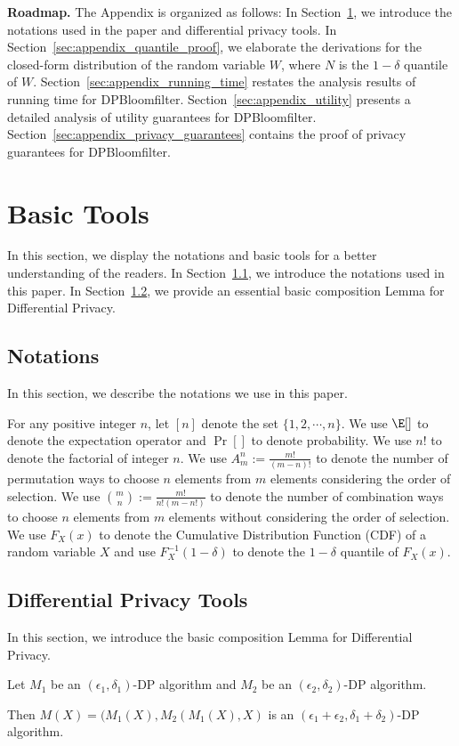 
{\bf Roadmap.} The Appendix is organized as follows:
In Section~\ref{sec:appendix_basic_tools}, we introduce the notations used in the paper and differential privacy tools.
In Section~\ref{sec:appendix_quantile_proof}, we elaborate the derivations for the closed-form distribution of the random variable $W$, where $N$ is the $1 - \delta$ quantile of $W$. 
Section~\ref{sec:appendix_running_time} restates the analysis results of running time for DPBloomfilter.
Section~\ref{sec:appendix_utility} presents a detailed analysis of utility guarantees for DPBloomfilter.
Section~\ref{sec:appendix_privacy_guarantees} contains the proof of privacy guarantees for DPBloomfilter.


\section{Basic Tools} \label{sec:appendix_basic_tools}
In this section, we display the notations and basic tools for a better understanding of the readers. In Section~\ref{sec:appendix:notation},  we introduce the notations used in this paper. In Section~\ref{sec:apendix:composition}, we provide an essential basic composition Lemma for Differential Privacy.
\subsection{Notations}\label{sec:appendix:notation}
In this section, we describe the notations we use in this paper.

For any positive integer $n$, let $[n]$ denote the set $\{1, 2, \cdots , n\}$. We use $\E[]$ to denote the expectation operator and $\Pr[]$ to denote probability. We use $n!$ to denote the factorial of integer $n$. We use $A_{m}^{n}:=\frac{m!}{(m-n)!}$ to denote the number of permutation ways to choose $n$ elements from $m$ elements considering the order of selection. We use $\binom{m}{n}:=\frac{m!}{n!(m-n!)}$ to denote the number of combination ways to choose $n$ elements from $m$ elements without considering the order of selection. We use $F_{X}(x)$ to denote the Cumulative Distribution Function (CDF) of a random variable $X$ and use $F_{X}^{-1}(1-\delta)$ to denote the $1-\delta$ quantile of $F_{X}(x)$.

\subsection{Differential Privacy Tools}\label{sec:apendix:composition}
In this section, we introduce the basic composition Lemma for Differential Privacy.
\begin{lemma}\label{lem:append_com_lem}
    Let $M_1$ be an $(\epsilon_1,\delta_1)$-DP algorithm and $M_2$ be an $(\epsilon_2,\delta_2)$-DP algorithm. 
    
    Then $M(X) = (M_1(X),M_2(M_1(X),X)$ is an $(\epsilon_1+\epsilon_2,\delta_1+\delta_2)$-DP algorithm.
\end{lemma}


